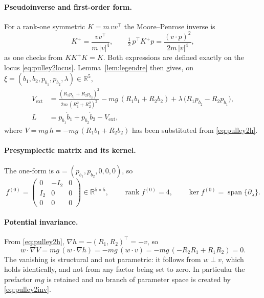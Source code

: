 \documentclass[12pt]{article}
\theoremstyle{plain}
\theoremstyle{definition}
\theoremstyle{remark}
\newcommand{\R}{\mathbb{R}}
\DeclareMathOperator{\rank}{rank}
\DeclareMathOperator{\spn}{span}
\begin{document}
	\paragraph{Pseudoinverse and first-order form.} For a rank-one symmetric
	$K=m\,vv^{\top}$ the Moore--Penrose inverse is
	\begin{equation}
		K^{+}=\frac{vv^{\top}}{m\,|v|^{4}},
		\qquad
		\tfrac12\,p^{\top}K^{+}p=\frac{(v\!\cdot\!p)^{2}}{2m\,|v|^{4}},
		\label{eq:pulley2Kplus}
	\end{equation}
	as one checks from $KK^{+}K=K$. Both expressions are defined exactly on the
	locus \eqref{eq:pulley2locus}. Lemma~\ref{lem:legendre} then gives, on
	$\xi=(b_{1},b_{2},p_{b_{1}},p_{b_{2}},\lambda)\in\R^{5}$,
	\begin{align}
		V_{\mathrm{ext}}&=\frac{(R_{1}p_{b_{1}}+R_{2}p_{b_{2}})^{2}}
		{2m\,(R_{1}^{2}+R_{2}^{2})^{2}}
		-mg\,(R_{1}b_{1}+R_{2}b_{2})
		+\lambda\,\bigl(R_{1}p_{b_{2}}-R_{2}p_{b_{1}}\bigr),
		\label{eq:pulley2Vext}\\[0.2em]
		L&=p_{b_{1}}\dot b_{1}+p_{b_{2}}\dot b_{2}-V_{\mathrm{ext}},
		\label{eq:pulley2LFJ}
	\end{align}
	where $V=mg\,h=-mg\,(R_{1}b_{1}+R_{2}b_{2})$ has been substituted from
	\eqref{eq:pulley2h}.
	
	\paragraph{Presymplectic matrix and its kernel.} The one-form is
	$a=(p_{b_{1}},p_{b_{2}},0,0,0)$, so
	\begin{equation}
		f^{(0)}=\begin{pmatrix}0&-I_{2}&0\\ I_{2}&0&0\\ 0&0&0\end{pmatrix}
		\in\R^{5\times5},
		\qquad
		\rank f^{(0)}=4,
		\qquad
		\ker f^{(0)}=\spn\{\partial_{\lambda}\} .
		\label{eq:pulley2f0}
	\end{equation}
	
	\paragraph{Potential invariance.} From \eqref{eq:pulley2h},
	$\nabla h=-(R_{1},R_{2})^{\top}=-v$, so
	\begin{equation}
		w\!\cdot\!\nabla V=mg\,(w\!\cdot\!\nabla h)=-mg\,(w\!\cdot\!v)
		=-mg\,(-R_{2}R_{1}+R_{1}R_{2})=0 .
		\label{eq:pulley2inv}
	\end{equation}
	The vanishing is structural and not parametric: it follows from $w\perp v$,
	which holds identically, and not from any factor being set to zero. In
	particular the prefactor $mg$ is retained and no branch of parameter space is
	created by \eqref{eq:pulley2inv}.
	
\end{document}
